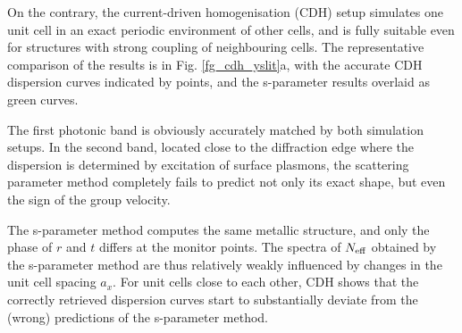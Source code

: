 On the contrary, the current-driven homogenisation (CDH) setup simulates one unit cell in an exact periodic environment of other cells, and is fully  suitable even for structures with strong coupling of neighbouring cells. The representative comparison of the results is in Fig. \ref{fg_cdh_yslit}a, with the accurate CDH dispersion curves indicated by points, and the s-parameter results overlaid as green curves. 

The first photonic band is obviously accurately matched by both simulation setups. In the second band, located close to the diffraction edge where the dispersion is determined by excitation of surface plasmons, the scattering parameter method completely fails to predict not only its exact shape, but even the sign of the group velocity. 


The s-parameter method computes the same metallic structure, and only the phase of $r$ and $t$ differs at the monitor points. The spectra of $N_{\text{eff} }$ obtained by the s-parameter method are thus relatively weakly influenced by changes in the unit cell spacing $a_x$. For unit cells close to each other, CDH shows that the correctly retrieved dispersion curves start to substantially deviate from the (wrong) predictions of the s-parameter method.


